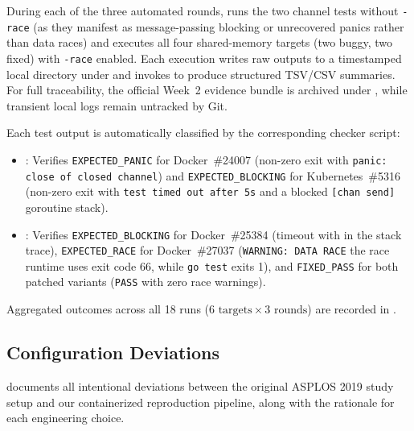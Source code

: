 During each of the three automated rounds,  runs the two channel tests without \texttt{-race} (as they manifest as message-passing blocking or unrecovered panics rather than data races) and executes all four shared-memory targets (two buggy, two fixed) with \texttt{-race} enabled. Each execution writes raw outputs to a timestamped local directory under  and invokes  to produce structured TSV/CSV summaries. For full traceability, the official Week~2 evidence bundle is archived under , while transient local logs remain untracked by Git.

Each test output is automatically classified by the corresponding checker script:
\begin{itemize}
  \item {}: Verifies \texttt{EXPECTED\_PANIC} for Docker~\#24007 (non-zero exit with \texttt{panic: close of closed channel}) and \texttt{EXPECTED\_BLOCKING} for Kubernetes~\#5316 (non-zero exit with \texttt{test timed out after 5s} and a blocked \texttt{[chan send]} goroutine stack).
  \item {}: Verifies \texttt{EXPECTED\_BLOCKING} for Docker~\#25384 (timeout with  in the stack trace), \texttt{EXPECTED\_RACE} for Docker~\#27037 (\texttt{WARNING: DATA RACE} the race runtime uses exit code 66, while \texttt{go test} exits 1), and \texttt{FIXED\_PASS} for both patched variants (\texttt{PASS} with zero race warnings).
\end{itemize}
Aggregated outcomes across all 18 runs ($6 \text{ targets} \times 3 \text{ rounds}$) are recorded in .

\subsection{Configuration Deviations}
 documents all intentional deviations between the original ASPLOS 2019 study setup and our containerized reproduction pipeline, along with the rationale for each engineering choice.

